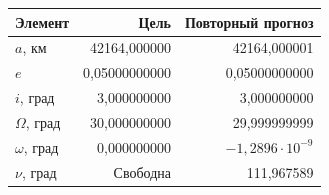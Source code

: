 \begin{tabular}{@{}lrr@{}}
\toprule
Элемент & Цель & Повторный прогноз \\
\midrule
$a$, км & 42164{,}000000 & 42164{,}000001 \\
$e$ & 0{,}05000000000 & 0{,}05000000000 \\
$i$, град & 3{,}000000000 & 3{,}000000000 \\
$\Omega$, град & 30{,}000000000 & 29{,}999999999 \\
$\omega$, град & 0{,}000000000 & $-1{,}2896\cdot10^{-9}$ \\
$\nu$, град & Свободна & 111{,}967589 \\
\bottomrule
\end{tabular}
